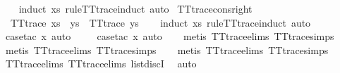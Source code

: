 \begin{isabellebody}
%
\isadelimproof
\ \ %
\endisadelimproof
%
\isatagproof
{}\isamarkupfalse%
\ {\isacharparenleft}induct\ xs\ rule{\isacharcolon}TT{}{\isacharunderscore}trace{\isachardot}induct{\isacharcomma}\ auto{\isacharparenright}%
\endisatagproof
{\isafoldproof}%
%
\isadelimproof
\isanewline
%
\endisadelimproof
\isanewline
{}\isamarkupfalse%
\ TT{}{\isacharunderscore}trace{\isacharunderscore}cons{\isacharunderscore}right{\isacharcolon}\isanewline
\ \ {\isachardoublequoteopen}TT{}{\isacharunderscore}trace\ {\isacharparenleft}xs\ {\isacharat}\ ys{\isacharparenright}\ {\isasymLongrightarrow}\ TT{}{\isacharunderscore}trace\ ys{\isachardoublequoteclose}\isanewline
%
\isadelimproof
\ \ %
\endisadelimproof
%
\isatagproof
{}\isamarkupfalse%
\ {\isacharparenleft}induct\ xs\ rule{\isacharcolon}TT{}{\isacharunderscore}trace{\isachardot}induct{\isacharcomma}\ auto{\isacharparenright}\isanewline
\ \ \isamarkupfalse%
\ {\isacharparenleft}case{\isacharunderscore}tac\ x{\isacharcomma}\ auto{\isacharparenright}\isanewline
\ \ \ \isamarkupfalse%
\ {\isacharparenleft}case{\isacharunderscore}tac\ x{}{\isacharcomma}\ auto{\isacharparenright}\isanewline
\ \ \isamarkupfalse%
\ {\isacharparenleft}metis\ TT{}{\isacharunderscore}trace{\isachardot}elims{\isacharparenleft}{}{\isacharparenright}\ TT{}{\isacharunderscore}trace{\isachardot}simps{\isacharparenleft}{}{\isacharparenright}{\isacharparenright}\isanewline
\ \ \isamarkupfalse%
\ {\isacharparenleft}metis\ TT{}{\isacharunderscore}trace{\isachardot}elims{\isacharparenleft}{}{\isacharparenright}\ TT{}{\isacharunderscore}trace{\isachardot}simps{\isacharparenleft}{}{\isacharparenright}{\isacharparenright}\isanewline
\ \ \isamarkupfalse%
\ {\isacharparenleft}metis\ TT{}{\isacharunderscore}trace{\isachardot}elims{\isacharparenleft}{}{\isacharparenright}\ TT{}{\isacharunderscore}trace{\isachardot}simps{\isacharparenleft}{}{\isacharparenright}{\isacharparenright}\isanewline
\ \ \isamarkupfalse%
\ TT{}{\isacharunderscore}trace{\isachardot}elims{\isacharparenleft}{}{\isacharparenright}\ TT{}{\isacharunderscore}trace{\isachardot}elims{\isacharparenleft}{}{\isacharparenright}\ list{\isachardot}discI\ \isamarkupfalse%
\ auto%
\endisatagproof

\end{isabellebody}
